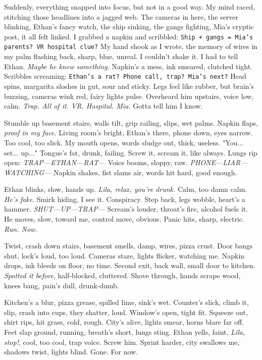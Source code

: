 \documentclass[12pt,oneside]{book} %
\newcommand{\note}[1]{\texttt{#1}}
\begin{document}
Suddenly, everything snapped into focus, but not in a good way. My mind raced, stitching those headlines into a jagged web. The cameras in here, the server blinking, Ethan’s fancy watch, the ship sinking, the gangs fighting, Mia’s cryptic post, it all felt linked. I grabbed a napkin and scribbled: \note{Ship + gangs = Mia’s parents? VR hospital clue?} My hand shook as I wrote, the memory of wires in my palm flashing back, sharp, blue, unreal. I couldn’t shake it. I had to tell Ethan. \textit{Maybe he knew something.} Napkin’s a mess, ink smeared, clutched tight. Scribbles screaming: \note{Ethan’s a rat? Phone call, trap? Mia’s next?} Head spins, margarita sloshes in gut, sour and sticky. Legs feel like rubber, but brain’s buzzing, cameras wink red, fairy lights pulse. Overheard him upstairs, voice low, calm. \textit{Trap. All of it. VR. Hospital. Mia.} Gotta tell him I know.

Stumble up basement stairs, walls tilt, grip railing, slips, wet palms. Napkin flaps, \textit{proof in my face.} Living room’s bright, Ethan’s there, phone down, eyes narrow. Too cool, too slick. My mouth opens, words sludge out, thick, useless. "You... set... up..." Tongue’s fat, drunk, failing. Screw it, scream it, like always. Lungs rip open: \textit{TRAP—ETHAN—RAT—} Voice booms, sloppy, raw. \textit{PHONE—LIAR—WATCHING—} Napkin shakes, fist slams air, words hit hard, good enough.

Ethan blinks, slow, hands up. \textit{Lila, relax, you’re drunk.} Calm, too damn calm. \textit{He's fake}. Smirk hiding, I see it. Conspiracy. Step back, legs wobble, heart’s a hammer. \textit{SHUT—UP—TRAP—} Scream’s louder, throat’s fire, alcohol fuels it. He moves, slow, toward me, control move, obvious. Panic hits, sharp, electric. \textit{Run. Now.}

Twist, crash down stairs, basement smells, damp, wires, pizza crust. Door bangs shut, lock’s loud, too loud. Cameras stare, lights flicker, watching me. Napkin drops, ink bleeds on floor, no time. Second exit, back wall, small door to kitchen. \textit{Spotted it before}, half-blocked, cluttered. Shove through, hands scrape wood, knees bang, pain’s dull, drunk-dumb.

Kitchen’s a blur, pizza grease, spilled lime, sink’s wet. Counter’s slick, climb it, slip, crash into cups, they shatter, loud. Window’s open, tight fit. Squeeze out, shirt rips, hit grass, cold, rough. City’s alive, lights smear, horns blare far off. Feet slap ground, running, breath’s short, lungs sting. Ethan yells, faint, \textit{Lila, stop!}, cool, too cool, trap voice. Screw him. Sprint harder, city swallows me, shadows twist, lights blind. Gone. For now.
\end{document}
